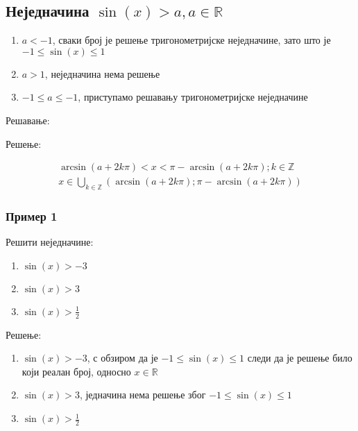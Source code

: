 \documentclass[../diplomski.tex]{subfiles}
\begin{document}
\subsection{Неједначина $\sin(x)>a,a\in\mathbb{R}$}

\begin{enumerate}[label=\alph*)]
\item $a<-1$, сваки број је решење тригонометријске неједначине, зато што је $-1\leq\sin(x)\leq1$
\item $a>1$, неједначина нема решење
\item $-1\leq a\leq-1$, приступамо решавању тригонометријске неједначине
\end{enumerate}

Решавање:



Решење:

\begin{equation}
\begin{split}
\arcsin(a+2k\pi)<x<\pi-\arcsin(a+2k\pi);k\in\mathbb{Z}\\
x\in\bigcup\limits_{k\in\mathbb{Z}}\left(\arcsin(a+2k\pi);\pi-\arcsin(a+2k\pi)\right)
\end{split}
\end{equation}


\subsubsection{Пример 1}

Решити неједначине:

\begin{enumerate}[label=\alph*)]
\item $\sin(x)>-3$
\item $\sin(x)>3$
\item $\sin(x)>\frac{1}{2}$
\end{enumerate}

Решење:

\begin{enumerate}[label=\alph*)]
\item $\sin(x)>-3$, с обзиром да је $-1\le\sin(x)\le1$ следи да је решење било који реалан број, односно  $x\in\mathbb{R}$
\item $\sin(x)>3$, једначина нема решење због $-1\le\sin(x)\le1$
\item $\sin(x)>\frac{1}{2}$
\end{enumerate}
\end{document}
